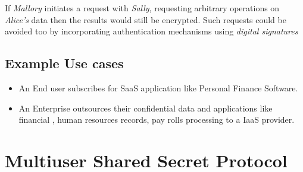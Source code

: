 \documentclass[conference]{IEEEtran}
\numberwithin{equation}{section}
\begin{document}
 If \emph{Mallory} initiates a request with \emph{Sally}, requesting arbitrary operations on \emph{Alice's} data then the results would still be encrypted. Such requests could be avoided too by incorporating authentication mechanisms using \emph{digital signatures} 
 \begin{comment}
  as mentioned in secure version of this protocol given in the Table \ref{basicProtocolSec}. 
 \begin{table}
\caption{Basic Protocol Secure Version}
\label{basicProtocolSec}
\renewcommand{\arraystretch}{2.5}
\begin{center}
\begin{tabular} {| c c c c | }
\hline
&\bf{Data Preparation}&&  \\
{1}&{A}&{:=}&{{}= (data)} \\
{2}&{AS}&{:=}&{()} \\
{3}&{S}&{:=}&{()} \\
\hline 
\hline
&\bf{Protocol Steps}&&  \\
{1}&{A}&{:=}&{{}=(x)} \\
{2}&{AS}&{:=}&{ (\emph{func},)} \\
{3}&{S}&{:=}& {()} \\
{4}&{S}&{:=}&{ {}= (\emph{func},,)} \\
{5}&{SA}&{:=}&{  ()} \\
{6}&{A}&{:=}&{ () } \\
{7}&{A}&{:=}&{y =  ()} \\
 \hline
\end{tabular}
\end{center}
\end{table}
\end{comment}
\subsection{Example Use cases}
\begin{itemize}
\item An End user subscribes for SaaS application like Personal Finance Software.
\item An Enterprise outsources their confidential data and applications like financial , human resources records, pay rolls processing to a IaaS provider. 
\end{itemize}
\section{Multiuser Shared Secret Protocol}
\end{document}
